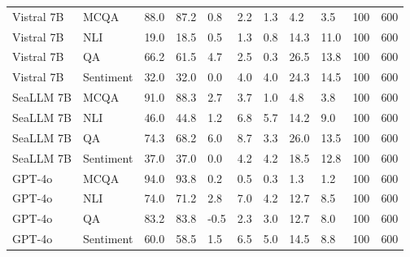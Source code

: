\begin{tabular}{lllllllllll}
  Vistral 7B &      MCQA & 88.0 &    87.2 &  0.8 &          2.2 &             1.3 &             4.2 &              3.5 &    100 &       600 \\
  Vistral 7B &       NLI & 19.0 &    18.5 &  0.5 &          1.3 &             0.8 &            14.3 &             11.0 &    100 &       600 \\
  Vistral 7B &        QA & 66.2 &    61.5 &  4.7 &          2.5 &             0.3 &            26.5 &             13.8 &    100 &       600 \\
  Vistral 7B & Sentiment & 32.0 &    32.0 &  0.0 &          4.0 &             4.0 &            24.3 &             14.5 &    100 &       600 \\
   SeaLLM 7B &      MCQA & 91.0 &    88.3 &  2.7 &          3.7 &             1.0 &             4.8 &              3.8 &    100 &       600 \\
   SeaLLM 7B &       NLI & 46.0 &    44.8 &  1.2 &          6.8 &             5.7 &            14.2 &              9.0 &    100 &       600 \\
   SeaLLM 7B &        QA & 74.3 &    68.2 &  6.0 &          8.7 &             3.3 &            26.0 &             13.5 &    100 &       600 \\
   SeaLLM 7B & Sentiment & 37.0 &    37.0 &  0.0 &          4.2 &             4.2 &            18.5 &             12.8 &    100 &       600 \\
      GPT-4o &      MCQA & 94.0 &    93.8 &  0.2 &          0.5 &             0.3 &             1.3 &              1.2 &    100 &       600 \\
      GPT-4o &       NLI & 74.0 &    71.2 &  2.8 &          7.0 &             4.2 &            12.7 &              8.5 &    100 &       600 \\
      GPT-4o &        QA & 83.2 &    83.8 & -0.5 &          2.3 &             3.0 &            12.7 &              8.0 &    100 &       600 \\
      GPT-4o & Sentiment & 60.0 &    58.5 &  1.5 &          6.5 &             5.0 &            14.5 &              8.8 &    100 &       600 \\
\bottomrule
\end{tabular}
